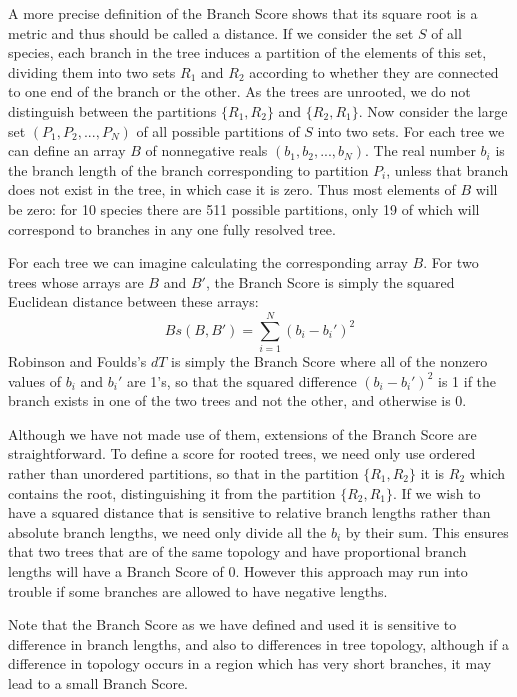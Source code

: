 A more precise definition of the Branch Score shows that its square root is a
metric and thus should be called a distance.  If we consider the set
$S$ of all species, each branch in the tree induces a partition of
the elements of this set, dividing them into two sets $R_1$ and $R_2$
according to whether they are connected to one end of the branch
or the other.  As the trees are unrooted, we do not distinguish between
the partitions $\{R_1, R_2\}$ and $\{R_2, R_1\}$.  Now consider the large set
$(P_1, P_2, ..., P_N)$ of all possible partitions of $S$ into two sets.  For
each tree
we can define an array $B$ of nonnegative reals $(b_1, b_2, ..., b_N)$.  The
real number $b_i$ is the branch length of the branch corresponding to
partition $P_i$, unless that branch does not exist in the tree, in which
case it is zero.  Thus most elements of $B$ will be zero: for 10 species
there are 511 possible partitions, 
only 19
of which will correspond to branches in any one fully resolved tree.

For each tree we can imagine calculating the corresponding array $B$.  For
two trees whose arrays are $B$ and $B'$, the Branch Score is simply the
squared Euclidean distance between these arrays:
\begin{equation}
Bs(B, B') = \sum_{i=1}^N (b_i - b_i')^2
\end{equation}
Robinson and Foulds's $dT$ is simply the Branch Score where all
of the nonzero values of $b_i$ and $b_i'$ are 1's, so that the squared
difference $(b_i - b_i')^2$ is 1 if the branch exists in one of the two
trees and not the other, and otherwise is 0.

Although we have not made use of them, extensions of the
Branch Score are straightforward. 
To define a score for rooted trees, we need only use ordered rather than
unordered partitions, so that in the partition $\{R_1, R_2\}$ it is $R_{2}$
which contains the root, distinguishing it from the partition $\{R_2,
R_1\}$.  If we wish to
have a squared distance that is sensitive to relative branch lengths
rather than absolute branch lengths, we need only divide all the $b_i$
by their sum.  This ensures that two trees that are of the same topology
and have proportional branch lengths will have a Branch Score of 0.  However this
approach may run into trouble if some branches are allowed to have
negative lengths.

Note that the Branch Score as we have defined and used it is sensitive to
difference in branch lengths, and also to differences in tree topology,
although if a difference in topology occurs in a region which has very
short branches, it may lead to a small Branch Score.

